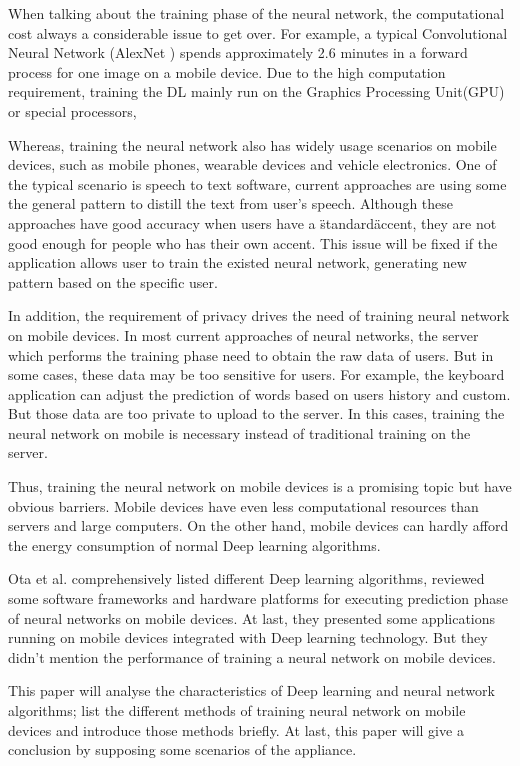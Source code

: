 \documentclass[article]{aaltoseries}
\begin{document}
When talking about the training phase of the neural network, the computational cost always a considerable
issue to get over. For example, a typical Convolutional Neural Network (AlexNet \cite{NIPS2012_4824}) 
spends approximately 2.6 minutes in a forward process for one image on a mobile device\cite{lane2015early}.
Due to the high computation requirement, training the DL mainly run on the Graphics Processing Unit(GPU) or special processors, 


Whereas, training the neural network also has widely usage scenarios on mobile devices, 
such as mobile phones, wearable devices and vehicle electronics. 
One of the typical scenario is speech to text software, current approaches are using some the general 
pattern to distill the text from user's speech. Although these approaches have good accuracy when users have
a \"standard\" accent, they are not good enough for people who has their own accent. This issue will be
fixed if the application allows user to train the existed neural network, generating new pattern based on 
the specific user.

In addition, the requirement of privacy drives the need of training neural network on mobile devices.
In most current approaches of neural networks, the server which performs the training phase need to obtain
the raw data of users. But in some cases, these data may be too sensitive for users. For example, the keyboard
application can adjust the prediction of words based on users history and custom. But those data are too 
private to upload to the server. In this cases, training the neural network on mobile is necessary instead of 
traditional training on the server.


Thus, training the neural network on mobile devices is a promising topic but have obvious barriers. 
Mobile devices have even less computational resources than 
servers and large computers. On the other hand, mobile devices can hardly afford the energy consumption
of normal Deep learning algorithms. 

Ota et al.\cite{Ota:2017} comprehensively listed different Deep learning algorithms,
reviewed some software frameworks and hardware platforms for executing prediction phase of neural networks on mobile devices.
At last, they presented some applications running on mobile devices integrated with Deep learning technology. 
But they didn't mention the performance of training a neural network on mobile devices. 

This paper will analyse the characteristics of Deep learning and neural network algorithms;
list the different methods of training neural network on mobile devices and introduce those methods briefly. 
At last, this paper will give a conclusion by supposing some scenarios of the appliance.
\end{document}
